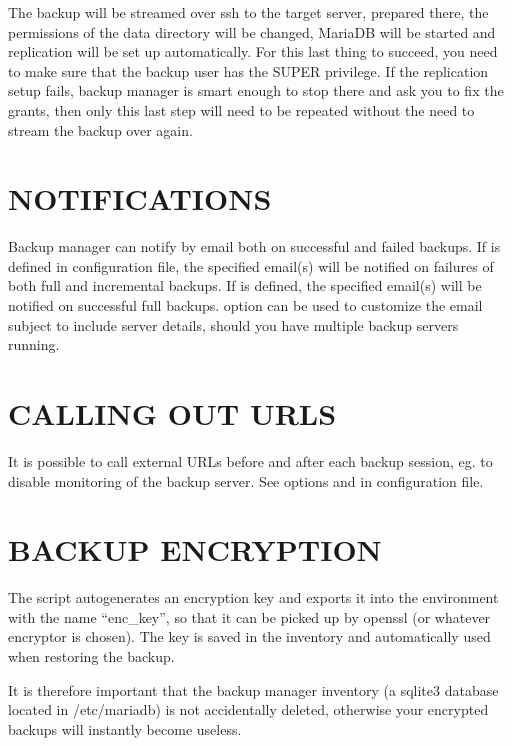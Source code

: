 \documentclass[letterpaper,10pt,english]{sphinxmanual}
\begin{document}
The backup will be streamed over ssh to the target server, prepared there, the permissions of
the data directory will be changed, MariaDB will be started and replication will be set up
automatically. For this last thing to succeed, you need to make sure that the backup user
has the SUPER privilege.  If the replication setup fails, backup manager is smart enough to
stop there and ask you to fix the grants, then only this last step will need to be repeated
without the need to stream the backup over again.


\section{NOTIFICATIONS}
\label{\detokenize{mariadb-backup-manager:notifications}}
Backup manager can notify by email both on successful and failed backups.
If  is defined in configuration file, the specified email(s) will be
notified on failures of both full and incremental backups.  If  is defined,
the specified email(s) will be notified on successful full backups.
 option can be used to customize the email subject to include server details,
should you have multiple backup servers running.


\section{CALLING OUT URLS}
\label{\detokenize{mariadb-backup-manager:calling-out-urls}}
It is possible to call external URLs before and after each backup session, eg. to disable
monitoring of the backup server. See options  and 
in configuration file.


\section{BACKUP ENCRYPTION}
\label{\detokenize{mariadb-backup-manager:backup-encryption}}
The script autogenerates an encryption key and exports it into the environment with the name
“enc\_key”, so that it can be picked up by openssl (or whatever encryptor is chosen).
The key is saved in the inventory and automatically used when restoring the backup.

It is therefore important that the backup manager inventory (a sqlite3 database located in
/etc/mariadb) is not accidentally deleted, otherwise your encrypted backups will instantly
become useless.
\end{document}
